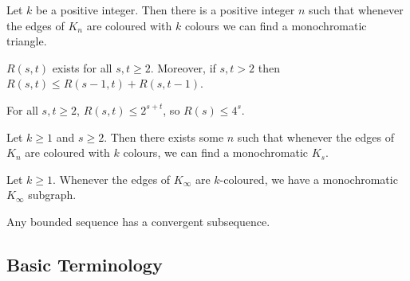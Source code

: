 \documentclass{article}
\begin{document}
\begin{nprop}\label{prop:1}
    Let $k$ be a positive integer.
    Then there is a positive integer $n$ such that whenever the edges of $K_n$ are coloured with $k$ colours we can find a monochromatic triangle.
\end{nprop}









\begin{nthm}\label{thm:ramsey}
    $R(s, t)$ exists for all $s, t \geq 2$.
    Moreover, if $s, t > 2$ then $R(s, t) \leq R(s-1, t) + R(s, t-1)$.
\end{nthm}

\begin{ncor}\label{cor:3}
    For all $s, t \geq 2$, $R(s, t) \leq 2^{s+t}$, so $R(s) \leq 4^s$.
\end{ncor}


\begin{nthm}\label{thm:multiRamsey}
    Let $k \geq 1$ and $s \geq 2$.
    Then there exists some $n$ such that whenever the edges of $K_n$ are coloured with $k$ colours, we can find a monochromatic $K_s$.
\end{nthm}


















\begin{nthm}\label{thm:infRamsey}
    Let $k \geq 1$. Whenever the edges of $K_\infty$ are $k$-coloured, we have a monochromatic $K_\infty$ subgraph.
\end{nthm}


\begin{ncor}
    Any bounded sequence has a convergent subsequence.
\end{ncor}

\subsection{Basic Terminology}
\end{document}

